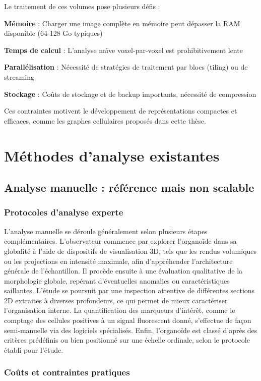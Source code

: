 Le traitement de ces volumes pose plusieurs défis :

\textbf{Mémoire} : Charger une image complète en mémoire peut dépasser la RAM disponible (64-128 Go typiques)

\textbf{Temps de calcul} : L'analyse naïve voxel-par-voxel est prohibitivement lente

\textbf{Parallélisation} : Nécessité de stratégies de traitement par blocs (tiling) ou de streaming

\textbf{Stockage} : Coûts de stockage et de backup importants, nécessité de compression

Ces contraintes motivent le développement de représentations compactes et efficaces, comme les graphes cellulaires proposés dans cette thèse.

\section{Méthodes d'analyse existantes}

\subsection{Analyse manuelle : référence mais non scalable}

\subsubsection{Protocoles d'analyse experte}

L'analyse manuelle se déroule généralement selon plusieurs étapes complémentaires. L'observateur commence par explorer l'organoïde dans sa globalité à l'aide de dispositifs de visualisation 3D, tels que les rendus volumiques ou les projections en intensité maximale, afin d'appréhender l'architecture générale de l'échantillon. Il procède ensuite à une évaluation qualitative de la morphologie globale, repérant d'éventuelles anomalies ou caractéristiques saillantes. L'étude se poursuit par une inspection attentive de différentes sections 2D extraites à diverses profondeurs, ce qui permet de mieux caractériser l'organisation interne. La quantification des marqueurs d'intérêt, comme le comptage des cellules positives à un signal fluorescent donné, s'effectue de façon semi-manuelle via des logiciels spécialisés. Enfin, l'organoïde est classé d'après des critères prédéfinis ou bien positionné sur une échelle ordinale, selon le protocole établi pour l'étude.

\subsubsection{Coûts et contraintes pratiques}

